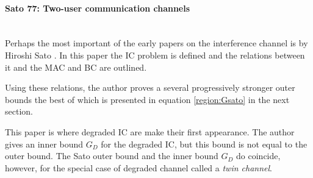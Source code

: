 \documentclass[aps,11pt,twoside,letterpaper]{article}
\begin{document}


            




        \paragraph{Sato 77: Two-user communication channels} \ \\

            Perhaps the most important of the early papers on the interference channel is 
            by Hiroshi Sato \cite{Sato77}.
            In this paper the IC problem is defined and the relations between it and the
            MAC and BC are outlined.
            
            Using these relations, the author proves a several progressively stronger 
            outer bounds the best of which is presented in equation \eqref{region:Gsato} in
            the next section.
            
            
            This paper is where degraded IC are make their first appearance.
            The author gives an inner bound $G_D$ for the degraded IC,
            but this bound is not equal to the outer bound.
            The Sato outer bound and the inner bound $G_D$ do coincide,
            however, for the special case of degraded channel called a \emph{twin channel}.
            
\end{document}
